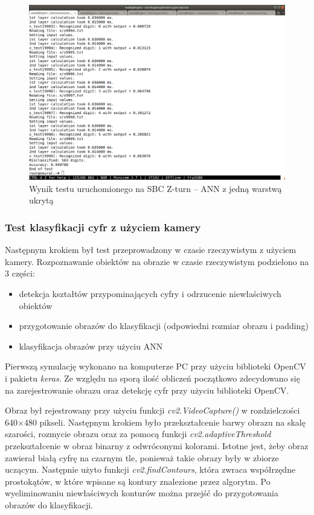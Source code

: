 \begin{figure}[!h]
    \centering
    \includegraphics[width=\textwidth]{img/wynik1.png}
    \caption{Wynik testu uruchomionego na SBC Z-turn -- ANN z jedną warstwą ukrytą}
    \label{wynik1}
  \end{figure}


\subsubsection{Test klasyfikacji cyfr z użyciem kamery}

Następnym krokiem był test przeprowadzony w czasie rzeczywistym z użyciem kamery. Rozpoznawanie obiektów na obrazie w czasie rzeczywistym podzielono na 3 części:
\begin{itemize}
    \item detekcja kształtów przypominających cyfry i odrzucenie niewłaściwych obiektów
    \item przygotowanie obrazów do klasyfikacji (odpowiedni rozmiar obrazu i padding)
    \item klasyfikacja obrazów przy użyciu ANN
\end{itemize}

Pierwszą symulację wykonano na komputerze PC przy użyciu biblioteki OpenCV i pakietu \emph{keras}.
Ze względu na sporą ilość obliczeń początkowo zdecydowano się na zarejestrowanie obrazu oraz 
detekcję cyfr przy użyciu biblioteki OpenCV. 

Obraz był rejestrowany przy użyciu funkcji \emph{cv2.VideoCapture()} w rozdzielczości 640$\times$480 pikseli. 
Następnym krokiem było przekształcenie barwy obrazu na skalę szarości, rozmycie obrazu oraz 
za pomocą funkcji \emph{cv2.adaptiveThreshold} przekształcenie w obraz binarny z odwróconymi 
kolorami. Istotne jest, żeby obraz zawierał białą cyfrę na czarnym tle, ponieważ takie obrazy były 
w zbiorze uczącym.  Następnie użyto funkcji \emph{cv2.findContours}, która zwraca współrzędne 
prostokątów, w które wpisane są kontury znalezione przez algorytm. Po wyeliminowaniu niewłaściwych 
konturów można przejść do przygotowania obrazów do klasyfikacji. 

